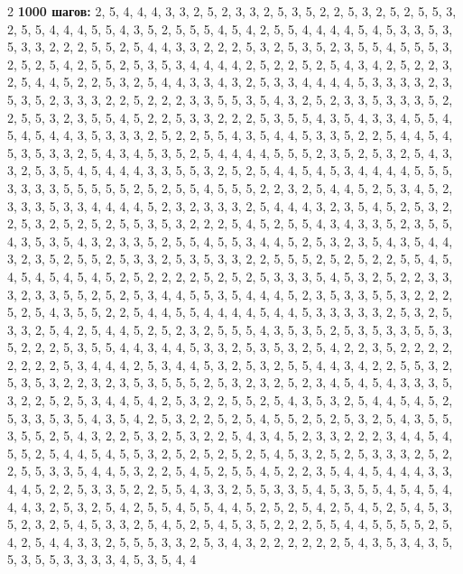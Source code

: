 \documentclass[a4paper, final]{article}
\begin{document}
\begin{multicols}{2}
	\noindent\textbf{1000 шагов:} 2, 5, 4, 4, 4, 3, 3, 2, 5, 2, 3, 3, 2, 5, 3, 5, 2, 2, 5, 3, 2, 5, 2, 5, 5, 3, 2, 5, 5, 4, 4, 4, 5, 5, 4, 3, 5, 2, 5, 5, 5, 4, 5, 4, 2, 5, 5, 4, 4, 4, 4, 5, 4, 5, 3, 3, 5, 3, 5, 3, 3, 2, 2, 2, 5, 5, 2, 5, 4, 4, 3, 3, 2, 2, 2, 5, 3, 2, 5, 3, 5, 2, 3, 5, 5, 4, 5, 5, 5, 3, 2, 5, 2, 5, 4, 2, 5, 5, 2, 5, 3, 5, 3, 4, 4, 4, 4, 2, 5, 2, 2, 5, 2, 5, 4, 3, 4, 2, 5, 2, 2, 3, 2, 5, 4, 4, 5, 2, 2, 5, 3, 2, 5, 4, 4, 3, 3, 4, 3, 2, 5, 3, 3, 4, 4, 4, 4, 5, 3, 3, 3, 3, 2, 3, 5, 3, 5, 2, 3, 3, 3, 2, 2, 5, 2, 2, 2, 3, 3, 5, 5, 3, 5, 4, 3, 2, 5, 2, 3, 3, 5, 3, 3, 3, 5, 2, 2, 5, 5, 3, 2, 3, 5, 5, 4, 5, 2, 2, 5, 3, 3, 2, 2, 2, 5, 3, 5, 5, 4, 3, 5, 4, 3, 3, 4, 5, 5, 4, 5, 4, 5, 4, 4, 3, 5, 3, 3, 3, 2, 5, 2, 2, 5, 5, 4, 3, 5, 4, 4, 5, 3, 3, 5, 2, 2, 5, 4, 4, 5, 4, 5, 3, 5, 3, 3, 2, 5, 4, 3, 4, 5, 3, 5, 2, 5, 4, 4, 4, 4, 5, 5, 5, 2, 3, 5, 2, 5, 3, 2, 5, 4, 3, 3, 2, 5, 3, 5, 4, 5, 4, 4, 4, 3, 3, 5, 5, 3, 2, 5, 2, 5, 4, 4, 5, 4, 5, 3, 4, 4, 4, 4, 5, 5, 5, 3, 3, 3, 3, 5, 5, 5, 5, 5, 2, 5, 2, 5, 5, 4, 5, 5, 5, 2, 2, 3, 2, 5, 4, 4, 5, 2, 5, 3, 4, 5, 2, 3, 3, 3, 5, 3, 3, 4, 4, 4, 4, 5, 2, 3, 2, 3, 3, 3, 2, 5, 4, 4, 4, 3, 2, 3, 5, 4, 5, 2, 5, 3, 2, 2, 5, 3, 2, 5, 2, 5, 2, 5, 5, 3, 5, 3, 2, 2, 2, 5, 4, 5, 2, 5, 5, 4, 3, 4, 3, 3, 5, 2, 3, 5, 5, 4, 3, 5, 3, 5, 4, 3, 2, 3, 3, 5, 2, 5, 5, 4, 5, 5, 3, 4, 4, 5, 2, 5, 3, 2, 3, 5, 4, 3, 5, 4, 4, 3, 2, 3, 5, 2, 5, 5, 2, 5, 3, 3, 2, 5, 3, 5, 3, 3, 2, 2, 5, 5, 5, 2, 5, 2, 5, 2, 2, 5, 5, 4, 5, 4, 5, 4, 5, 4, 5, 4, 5, 2, 5, 2, 2, 2, 2, 5, 2, 5, 2, 5, 3, 3, 3, 5, 4, 5, 3, 2, 5, 2, 2, 3, 3, 3, 2, 3, 3, 5, 5, 2, 5, 2, 5, 3, 4, 4, 5, 5, 3, 5, 4, 4, 4, 5, 2, 3, 5, 3, 3, 5, 5, 3, 2, 2, 2, 5, 2, 5, 4, 3, 5, 5, 2, 2, 5, 4, 4, 5, 5, 4, 4, 4, 4, 5, 4, 4, 5, 3, 3, 3, 3, 3, 2, 5, 3, 2, 5, 3, 3, 2, 5, 4, 2, 5, 4, 4, 5, 2, 5, 2, 3, 2, 5, 5, 5, 4, 3, 5, 3, 5, 2, 5, 3, 5, 3, 3, 5, 5, 3, 5, 2, 2, 2, 5, 3, 5, 5, 4, 4, 3, 4, 4, 5, 3, 3, 2, 5, 3, 5, 3, 2, 5, 4, 2, 2, 3, 5, 2, 2, 2, 2, 2, 2, 2, 2, 5, 3, 4, 4, 4, 2, 5, 3, 4, 4, 5, 3, 2, 5, 3, 2, 5, 5, 4, 4, 3, 4, 2, 2, 5, 5, 3, 2, 5, 3, 5, 3, 2, 2, 3, 2, 3, 5, 3, 5, 5, 5, 2, 5, 3, 2, 3, 2, 5, 2, 3, 4, 5, 4, 5, 4, 3, 3, 3, 5, 3, 2, 2, 5, 2, 5, 3, 4, 4, 5, 4, 2, 5, 3, 2, 2, 5, 5, 2, 5, 4, 3, 5, 3, 2, 5, 4, 4, 5, 4, 5, 2, 5, 3, 3, 5, 3, 5, 4, 3, 5, 4, 2, 5, 3, 2, 2, 5, 2, 5, 4, 5, 5, 2, 5, 2, 5, 3, 2, 5, 4, 3, 5, 5, 3, 5, 5, 2, 5, 4, 3, 2, 2, 5, 3, 2, 5, 3, 2, 2, 5, 4, 3, 4, 5, 2, 3, 3, 2, 2, 2, 3, 4, 4, 5, 4, 5, 5, 2, 5, 4, 4, 5, 4, 5, 5, 3, 2, 5, 2, 5, 2, 5, 2, 5, 4, 5, 3, 2, 5, 2, 5, 3, 3, 3, 2, 5, 2, 2, 5, 5, 3, 3, 5, 4, 4, 5, 3, 2, 2, 5, 4, 5, 2, 5, 5, 4, 5, 2, 2, 3, 5, 4, 4, 5, 4, 4, 4, 3, 3, 4, 4, 5, 2, 2, 5, 3, 3, 5, 2, 2, 5, 5, 4, 3, 3, 2, 5, 5, 3, 3, 5, 4, 5, 3, 5, 5, 4, 5, 4, 5, 4, 4, 4, 3, 2, 5, 3, 2, 5, 4, 2, 5, 5, 4, 5, 5, 4, 4, 5, 2, 5, 2, 5, 4, 2, 5, 4, 5, 2, 5, 4, 5, 3, 5, 2, 3, 2, 5, 4, 5, 3, 3, 2, 5, 4, 5, 2, 5, 4, 5, 3, 5, 2, 2, 2, 5, 5, 4, 4, 5, 5, 5, 5, 2, 5, 4, 2, 5, 4, 4, 3, 3, 2, 5, 5, 5, 3, 3, 2, 5, 3, 4, 3, 2, 2, 2, 2, 2, 2, 5, 4, 3, 5, 3, 4, 3, 5, 5, 3, 5, 5, 3, 3, 3, 3, 4, 5, 3, 5, 4, 4\par\smallskip
	\medskip
\end{multicols}
\endgroup
\end{document}

